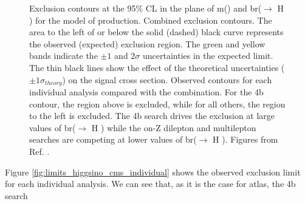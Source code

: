 \begin{figure}[htbp]
	\centering 
	\caption{
	Exclusion contours at the 95\% CL in the plane of m(\ninoone) and \gls{br}(\ninoone $\to$ H \gravino) for the model of \ninoone\ninoone production.
	Combined exclusion contours. The area to the left of or below the solid (dashed) black curve represents the observed (expected) exclusion region. The green and yellow bands indicate the $\pm1$ and $2\sigma$ uncertainties in the expected limit. The thin black lines show the effect of the theoretical uncertainties ($\pm1\sigma_{theory}$) on the signal cross section.
	Observed contours for each individual analysis compared with the combination. For the 4b contour, the region above is excluded, while for all others, the region to the left is excluded. The 4b search drives the exclusion at large values of \gls{br}(\ninoone $\to$ H \gravino) while the on-Z dilepton and multilepton searches are competing at lower values of \gls{br}(\ninoone $\to$ H \gravino).
	Figures from Ref. \cite{Sirunyan:2018ubx}.
		}
	\label{fig:limits_higgsino_cms}
\end{figure}

Figure \ref{fig:limits_higgsino_cms_individual} shows the observed exclusion limit for each individual analysis. 
We can see that, as it is the case for \gls{atlas}, the 4b search \cite{Sirunyan:2017obz} 

